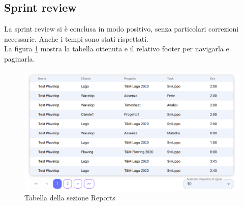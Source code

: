\subsection{Sprint review}
La sprint review si è conclusa in modo positivo, senza particolari correzioni necessarie. Anche i tempi sono stati rispettati.\\
La figura \ref{fig:report_table} mostra la tabella ottenuta e il relativo footer per navigarla e paginarla.

\begin{figure}[H]
	\includegraphics[width = \textwidth]{immagini/reports table.png}
	\caption{Tabella della sezione Reports}
	\label{fig:report_table}
\end{figure}